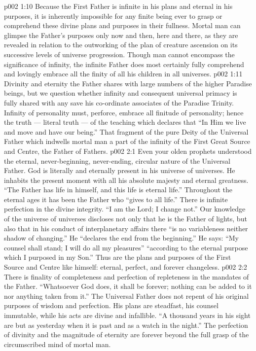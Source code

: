 \vs p002 1:10 \pc Because the First Father is infinite in his plans and eternal in his purposes, it is inherently impossible for any finite being ever to grasp or comprehend these divine plans and purposes in their fullness. Mortal man can glimpse the Father’s purposes only now and then, here and there, as they are revealed in relation to the outworking of the plan of creature ascension on its successive levels of universe progression. Though man cannot encompass the significance of infinity, the infinite Father does most certainly fully comprehend and lovingly embrace all the finity of all his children in all universes.
\vs p002 1:11 Divinity and eternity the Father shares with large numbers of the higher Paradise beings, but we question whether infinity and consequent universal primacy is fully shared with any save his co\hyp{}ordinate associates of the Paradise Trinity. Infinity of personality must, perforce, embrace all finitude of personality; hence the truth --- literal truth --- of the teaching which declares that “In Him we live and move and have our being.” That fragment of the pure Deity of the Universal Father which indwells mortal man  a part of the infinity of the First Great Source and Centre, the Father of Fathers.
\vs p002 2:1 Even your olden prophets understood the eternal, never\hyp{}beginning, never\hyp{}ending, circular nature of the Universal Father. God is literally and eternally present in his universe of universes. He inhabits the present moment with all his absolute majesty and eternal greatness. “The Father has life in himself, and this life is eternal life.” Throughout the eternal ages it has been the Father who “gives to all life.” There is infinite perfection in the divine integrity. “I am the Lord; I change not.” Our knowledge of the universe of universes discloses not only that he is the Father of lights, but also that in his conduct of interplanetary affairs there “is no variableness neither shadow of changing.” He “declares the end from the beginning.” He says: “My counsel shall stand; I will do all my pleasures” “according to the eternal purpose which I purposed in my Son.” Thus are the plans and purposes of the First Source and Centre like himself: eternal, perfect, and forever changeless.
\vs p002 2:2 There is finality of completeness and perfection of repleteness in the mandates of the Father. “Whatsoever God does, it shall be forever; nothing can be added to it nor anything taken from it.” The Universal Father does not repent of his original purposes of wisdom and perfection. His plans are steadfast, his counsel immutable, while his acts are divine and infallible. “A thousand years in his sight are but as yesterday when it is past and as a watch in the night.” The perfection of divinity and the magnitude of eternity are forever beyond the full grasp of the circumscribed mind of mortal man.
